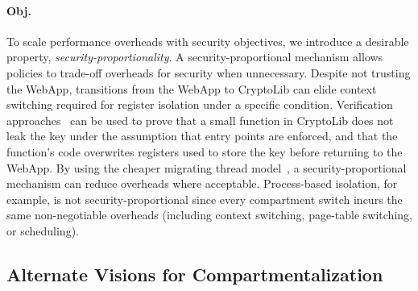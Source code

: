 \paragraph{Obj. }
To scale performance overheads with security objectives, we
introduce a desirable property, \emph{security-proportionality}.
A security-proportional mechanism allows policies to trade-off 
overheads for security when unnecessary.
Despite not trusting the WebApp, transitions from the WebApp to
CryptoLib can elide context switching required for register 
isolation under a specific condition.
Verification approaches~\cite{KolosickNJWLGJS22Verizero,ChenRSL16} 
can be used to prove that a small function in CryptoLib does not leak the key
under the assumption that entry points are enforced,
and that the function's code overwrites registers used to store the key 
before returning to the WebApp.
By using the cheaper migrating thread model~\cite{FordL94},
a security-proportional mechanism can reduce overheads where acceptable.
Process-based isolation, for example, is not security-proportional
since every compartment switch incurs the same non-negotiable overheads 
(including context switching, page-table switching, or scheduling).

\subsection{Alternate Visions for Compartmentalization}
\label{sec:reqs:related}

